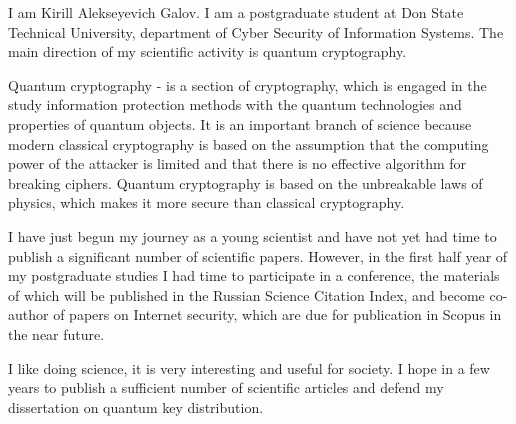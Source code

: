 


I am Kirill Alekseyevich Galov. I am a postgraduate student at Don State Technical University, department of Cyber Security of Information Systems. The main direction of my scientific activity is quantum cryptography.

Quantum cryptography - is a section of cryptography, which is engaged in the study information protection methods with the quantum technologies and properties of quantum objects. It is an important branch of science because modern classical cryptography is based on the assumption that the computing power of the attacker is limited and that there is no effective algorithm for breaking ciphers. Quantum cryptography is based on the unbreakable laws of physics, which makes it more secure than classical cryptography.

I have just begun my journey as a young scientist and have not yet had time to publish a significant number of scientific papers. However, in the first half year of my postgraduate studies I had time to participate in a conference, the materials of which will be published in the Russian Science Citation Index, and become co-author of papers on Internet security, which are due for publication in Scopus in the near future.

I like doing science, it is very interesting and useful for society. I hope in a few years to publish a sufficient number of scientific articles and defend my dissertation on quantum key distribution.


